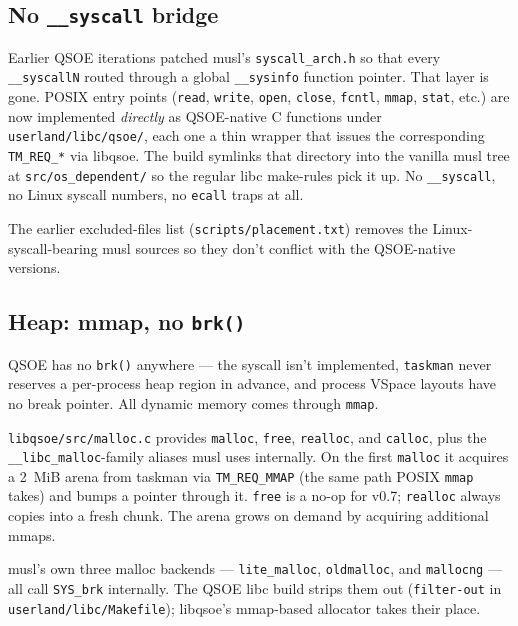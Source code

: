 \subsection{No \texttt{\_\_syscall} bridge}

Earlier QSOE iterations patched musl's \texttt{syscall\_arch.h} so that
every \texttt{\_\_syscallN} routed through a global \texttt{\_\_sysinfo}
function pointer.  That layer is gone.  POSIX entry points
(\texttt{read}, \texttt{write}, \texttt{open}, \texttt{close},
\texttt{fcntl}, \texttt{mmap}, \texttt{stat}, etc.) are now implemented
\emph{directly} as QSOE-native C functions under
\texttt{userland/libc/qsoe/}, each one a thin wrapper that issues the
corresponding \texttt{TM\_REQ\_*} via libqsoe.  The build symlinks that
directory into the vanilla musl tree at \texttt{src/os\_dependent/} so
the regular libc make-rules pick it up.  No \texttt{\_\_syscall},
no Linux syscall numbers, no \texttt{ecall} traps at all.

The earlier excluded-files list (\texttt{scripts/placement.txt})
removes the Linux-syscall-bearing musl sources so they don't conflict
with the QSOE-native versions.

\subsection{Heap: mmap, no \texttt{brk()}}
\label{sec:libc-heap}

QSOE has no \texttt{brk()} anywhere --- the syscall isn't implemented,
\texttt{taskman} never reserves a per-process heap region in advance,
and process VSpace layouts have no break pointer.  All dynamic memory
comes through \texttt{mmap}.

\texttt{libqsoe/src/malloc.c} provides \texttt{malloc}, \texttt{free},
\texttt{realloc}, and \texttt{calloc}, plus the
\texttt{\_\_libc\_malloc}-family aliases musl uses internally.  On the
first \texttt{malloc} it acquires a 2~MiB arena from taskman via
\texttt{TM\_REQ\_MMAP} (the same path POSIX \texttt{mmap} takes) and
bumps a pointer through it.  \texttt{free} is a no-op for v0.7;
\texttt{realloc} always copies into a fresh chunk.  The arena grows on
demand by acquiring additional mmaps.

musl's own three malloc backends --- \texttt{lite\_malloc},
\texttt{oldmalloc}, and \texttt{mallocng} --- all call \texttt{SYS\_brk}
internally.  The QSOE libc build strips them out (\texttt{filter-out}
in \texttt{userland/libc/Makefile}); libqsoe's mmap-based allocator
takes their place.

